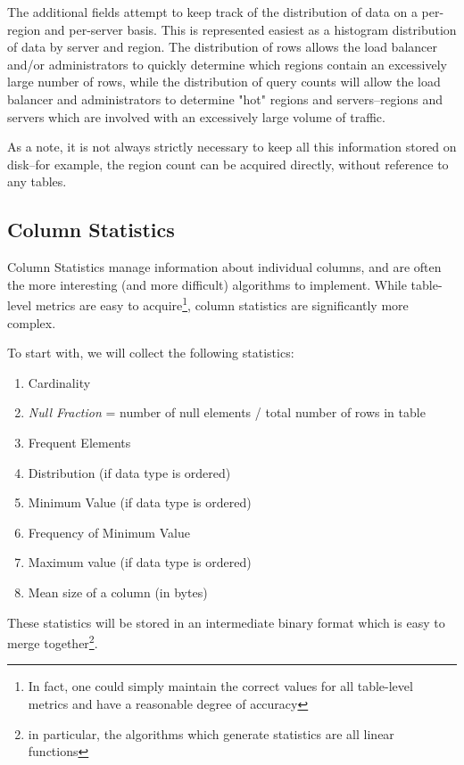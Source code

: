 The additional fields attempt to keep track of the distribution of data on a per-region and per-server basis. This is represented easiest as a histogram distribution of data by server and region. The distribution of rows allows the load balancer and/or administrators to quickly determine which regions contain an excessively large number of rows, while the distribution of query counts will allow the load balancer and administrators to determine "hot" regions and servers--regions and servers which are involved with an excessively large volume of traffic.

As a note, it is not always strictly necessary to keep all this information stored on disk--for example, the region count can be acquired directly, without reference to any tables.

\subsection{Column Statistics}
Column Statistics manage information about individual columns, and are often the more interesting (and more difficult) algorithms to implement. While table-level metrics are easy to acquire\footnote{In fact, one could simply maintain the correct values for all table-level metrics and have a reasonable degree of accuracy}, column statistics are significantly more complex. 

To start with, we will collect the following statistics:

\begin{enumerate}
				\item Cardinality
				\item \emph{Null Fraction} = number of null elements / total number of rows in table
				\item Frequent Elements
				\item Distribution (if data type is ordered)
				\item Minimum Value (if data type is ordered)
				\item Frequency of Minimum Value
				\item Maximum value (if data type is ordered)
				\item Mean size of a column (in bytes)
\end{enumerate}

These statistics will be stored in an intermediate binary format which is easy to merge together\footnote{in particular, the algorithms which generate statistics are all linear functions}.

